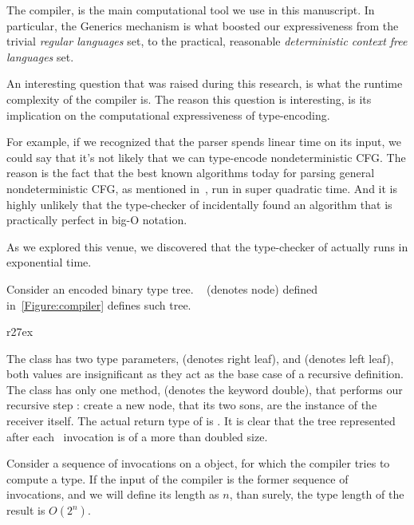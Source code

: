The \Java compiler, is the main computational tool we use 
  in this manuscript.
In particular, the \Java Generics mechanism is what
  boosted our expressiveness from the trivial \emph{regular languages}
  set, to the practical, reasonable \emph{deterministic context free languages} set.
  
An interesting question that was raised during this research,
  is what the runtime complexity of the \Java compiler is.
The reason this question is interesting, is its implication 
  on the computational expressiveness of type-encoding.
  
For example, if we recognized that the \Java parser spends 
  linear time on its input, we could say that it's not 
  likely that we can type-encode nondeterministic CFG.
The reason is the fact that the best known algorithms 
  today for parsing general nondeterministic CFG, 
  as mentioned in~, run in super quadratic time.
And it is highly unlikely that the type-checker of \Java incidentally
  found an algorithm that is practically perfect in big-O notation.

As we explored this venue, we discovered that the type-checker of
  \Java actually runs in exponential time.
  
Consider an encoded binary type tree. ~ 
  (denotes node) defined in~\cref{Figure:compiler} defines such tree.

\begin{wrapfigure}[6]r{27ex}
  \caption{\label{Figure:compiler} Encoding of an binary type tree}
\end{wrapfigure}

The class has two type parameters,  (denotes right leaf),
  and  (denotes left leaf), both values are insignificant 
  as they act as the base case of a recursive definition.
The class has only one method,  (denotes the keyword double),
  that performs our recursive step : create a new node, that its two
  sons, are the instance of the receiver itself. 
The actual return type of  is
  .
It is clear that the tree represented after each~ invocation is
  of a more than doubled size.

Consider a sequence of  invocations on a   object,
  for which the \Java compiler tries to compute a type.
If the input of the compiler is the former sequence of invocations,
  and we will define its length as $n$,
  than surely, the type length of the result is $O(2^n)$.

